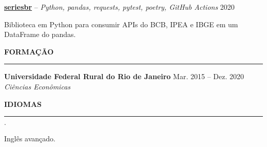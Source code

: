 \documentclass[11pt,letterpaper]{article}
\newenvironment{tightlist}
  {\begin{list}
    {$\cdot$}
    {
      \setlength{\leftmargin}{0em}
      \setlength{\itemsep}{-\smallskipamount}
    }
  }
{\end{list}}
\begin{document}
\smallskip

\textbf{\href{https://github.com/phelipetls/seriesbr}{seriesbr}} -- \emph{Python, pandas, requests, pytest, poetry, GitHub Actions} \hfill 2020
{\parfillskip=0pt\par}
Biblioteca em Python para consumir APIs do BCB, IPEA e IBGE em um DataFrame do pandas.

\medskip \textbf{FORMAÇÃO} \medskip
\hrule

\textbf{Universidade Federal Rural do Rio de Janeiro} \hfill {Mar. 2015 -- Dez. 2020} \\
\emph{Ciências Econômicas}

\medskip \textbf{IDIOMAS} \medskip
\hrule

\begin{tightlist}
  \item Inglês avançado.
\end{tightlist}
\end{document}
